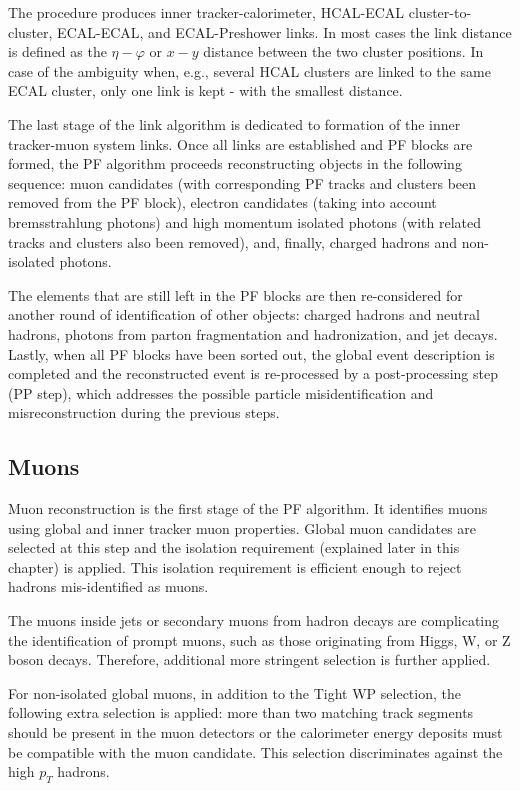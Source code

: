 \begin{small}
The procedure produces inner tracker-calorimeter, HCAL-ECAL cluster-to-cluster, ECAL-ECAL, and ECAL-Preshower links. In most cases the link distance is defined as the $\eta-\varphi$ or $x-y$ distance between the two cluster positions. In case of the ambiguity when, e.g., several HCAL clusters are linked to the same ECAL cluster, only one link is kept - with the smallest distance. 

The last stage of the link algorithm is dedicated to formation of the inner tracker-muon system links. Once all links are established and PF blocks are formed, the PF algorithm proceeds reconstructing objects in the following sequence: muon candidates (with corresponding PF tracks and clusters been removed from the PF block), electron candidates (taking into account bremsstrahlung photons) and high momentum isolated photons (with related tracks and clusters also been removed), and, finally, charged hadrons and non-isolated photons.

The elements that are still left in the PF blocks are then re-considered for another round of identification of other objects: charged hadrons and neutral hadrons, photons from parton fragmentation and hadronization, and jet decays. Lastly, when all PF blocks have been sorted out, the global event description is completed and the reconstructed event is re-processed by a post-processing step (PP step), which addresses the possible particle misidentification and misreconstruction during the previous steps. 

\subsection{Muons}\label{sec:muons}

Muon reconstruction is the first stage of the PF algorithm. It identifies muons using global and inner tracker muon properties. Global muon candidates are selected at this step and the isolation requirement (explained later in this chapter) is applied. 
This isolation requirement is efficient enough to reject hadrons mis-identified as muons. 

The muons inside jets or secondary muons from hadron decays are complicating the identification of prompt muons, such as those originating from Higgs, W, or Z boson decays. Therefore, additional more stringent selection is further applied. 

For non-isolated global muons, in addition to the Tight WP selection, the following extra selection is applied: more than two matching track segments should be present in the muon detectors or the calorimeter energy deposits must be compatible with the muon candidate. This selection discriminates against the high $p_T$ hadrons. 


\end{small}
